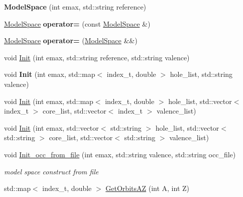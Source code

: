 \begin{DoxyCompactItemize}
\mbox{\label{classModelSpace_adb7d0069158164e7b6597a155eee4253}} 
{\bfseries Model\+Space} (int emax, std\+::string reference)
\item 
\mbox{\label{classModelSpace_a2b01062b499979b919b7b77b04745cbe}} 
\hyperlink{classModelSpace}{Model\+Space} {\bfseries operator=} (const \hyperlink{classModelSpace}{Model\+Space} \&)
\item 
\mbox{\label{classModelSpace_ab1d44cc22730d233506daa4f6e83187c}} 
\hyperlink{classModelSpace}{Model\+Space} {\bfseries operator=} (\hyperlink{classModelSpace}{Model\+Space} \&\&)
\item 
void \hyperlink{classModelSpace_aabf0b2634707a056eaf3f387ae837b86}{Init} (int emax, std\+::string reference, std\+::string valence)
\item 
\mbox{\label{classModelSpace_a0aa7a0c97d8c971210e2012d53490b32}} 
void {\bfseries Init} (int emax, std\+::map$<$ index\+\_\+t, double $>$ hole\+\_\+list, std\+::string valence)
\item 
void \hyperlink{classModelSpace_a134f18c926b82b66a59811f6a47e1db8}{Init} (int emax, std\+::map$<$ index\+\_\+t, double $>$ hole\+\_\+list, std\+::vector$<$ index\+\_\+t $>$ core\+\_\+list, std\+::vector$<$ index\+\_\+t $>$ valence\+\_\+list)
\item 
void \hyperlink{classModelSpace_a53306cc577aed149cd5cdeefcb32a668}{Init} (int emax, std\+::vector$<$ std\+::string $>$ hole\+\_\+list, std\+::vector$<$ std\+::string $>$ core\+\_\+list, std\+::vector$<$ std\+::string $>$ valence\+\_\+list)
\item 
\mbox{\label{classModelSpace_af1cc46cf7eff85b3932a1ab93350e2c8}} 
void \hyperlink{classModelSpace_af1cc46cf7eff85b3932a1ab93350e2c8}{Init\+\_\+occ\+\_\+from\+\_\+file} (int emax, std\+::string valence, std\+::string occ\+\_\+file)
\begin{DoxyCompactList}\small\item\em model space construct from file \end{DoxyCompactList}\item 
std\+::map$<$ index\+\_\+t, double $>$ \hyperlink{classModelSpace_a0cecf7817ce2bbf6c278924fd458e851}{Get\+Orbits\+AZ} (int A, int Z)
\item 
\mbox{\label{classModelSpace_a2370ffd4ec2d8e63db3a72b4a43784db}} 

\end{DoxyCompactItemize}
